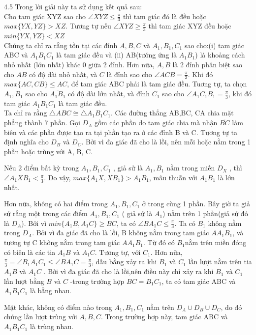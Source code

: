 \begin{Answer}{4.5}
Trong lời giải này ta sử dụng kết quả sau:
\\ Cho tam giác XYZ sao cho $\angle XYZ \leq \frac{\pi}{3}$ thì tam giác đó là đều hoặc $max\{YX,YZ\}>XZ$. Tương tự nếu $\angle XYZ \geq \frac{\pi}{3}$ thì tam giác XYZ đều hoặc $min\{YX,YZ\}<XZ$
\\ Chúng ta chỉ ra rằng tồn tại các đỉnh $A, B, C$ và $ A_1, B_1, C_1$ sao cho:(i) tam giác ABC và $A_1B_1C_1$ là tam giác đều và (ii) AB(tướng ứng là $A_1B_1$) là khoảng cách nhỏ nhất (lớn nhất) khác 0 giữa 2 đỉnh. Hơn nữa, $A,B$ là 2 đỉnh phân biệt sao cho $\overline{AB}$ có độ dài nhỏ nhất, và $C$ là đỉnh sao cho $\angle ACB =\frac{\pi}{3}$. Khi đó $max\{AC,CB\}\leq AC$, để tam giác ABC phải là tam giác đều. Tuơng tự, ta chọn $A_1,B_1$ sao cho $\overline{A_1B_1}$ có độ dài lớn nhất, và đỉnh $C_1$ sao cho $\angle A_1C_1B_1=\frac{\pi}{3}$, khi đó tam giác $A_1B_1C_1$ là tam giác đều.\\
Ta chỉ ra rằng $\triangle ABC\cong \triangle A_1B_1C_1$. Các đường thẳng AB,BC, CA chia mặt phẳng thành 7 phần. Gọi $D_A$ gồm các phần do tam giác chia mà nhận $\overline{BC}$ làm biên và các phần được tạo ra tại phần tạo ra ở các đỉnh B và C. Tương tự ta định nghĩa cho $D_B$ và $D_C$. Bởi vì đa giác đã cho là lồi, nên mỗi hoặc nằm trong 1 phần hoặc trùng với  A, B, C.

Nếu 2 điểm bất kỳ trong $A_1, B_1,C_1$ , giả sử là $A_1,B_1$ nằm trong miền $D_X$ , thì $\angle A_1XB_1 <\frac{\pi}{3}$. Do vậy, $max\{A_1X,XB_1\}>A_1B_1$, mâu thuẫn với $A_1B_1$ là lớn nhất.

Hơn nữa, không có hai điểm trong $A_1,B_1,C_1$ ở trong cùng 1 phần. Bây giờ ta giả sử rằng một trong các điểm $A_1, B_1,C_1$ ( giả sử là $A_1$)  nằm trên 1 phần(giả sử đó là $D_A$). Bởi vì $min\{A_1B,A_1C\}\geq BC$, ta có $\angle BA_1C\leq \frac{\pi}{3}$. Ta có $B_1$ không nằm trong $D_A$. Bởi vì đa giác đã cho là lồi, B không nằm trong tam giác $AA_1B_1$, và tương tự C không nằm trong tam giác $AA_1B_1$. Từ đó có $B_1$nằm trên miền đóng có biên là các tia $A_1B$ và $A_1C$. Tương tự, với $C_1$. Hơn nữa, $\frac{\pi}{3}=\angle B_1A_1C_1\leq \angle BA_1C=\frac{\pi}{3}$, dấu bằng xảy ra khi $B_1$ và $C_1$ lần lượt nằm trên tia $A_1B$ và $A_1C$ . Bởi vì đa giác đã cho là lồi,nên điều này chỉ xảy ra khi $B_1$ và $C_1$ lần lượt bằng $B$ và $C$ -trong trường hợp $BC=B_1C_1$, ta có tam giác ABC và $A_1B_1C_1$ là bằng nhau.

Mặt khác, không có điểm nào trong $A_1,B_1,C_1$ nằm trên $D_A \cup D_B \cup D_C$, do đó chúng lần lượt trùng với $A, B, C$. Trong trường hợp này, tam giác ABC và $A_1B_1C_1$ là trùng nhau.
\end{Answer}
